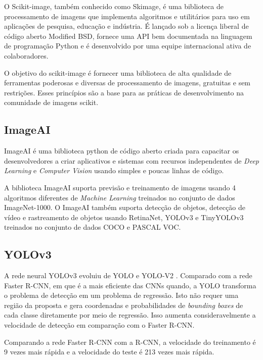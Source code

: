 O Scikit-image, também conhecido como Skimage, é uma biblioteca de processamento de imagens que implementa algoritmos e utilitários para uso em aplicações de pesquisa, educação e indústria. É lançado sob a licença liberal de código aberto Modified BSD, fornece uma API bem documentada na linguagem de programação Python e é desenvolvido por uma equipe internacional ativa de colaboradores.

O objetivo do scikit-image é fornecer uma biblioteca de alta qualidade de ferramentas poderosas e diversas de processamento de imagens, gratuitas e sem restrições. Esses princípios são a base para as práticas de desenvolvimento na comunidade de imagens scikit.\cite{skimage}

\subsection{ImageAI}

ImageAI é uma biblioteca python de código aberto criada para capacitar os desenvolvedores a criar aplicativos e sistemas com recursos independentes de \textit{Deep Learning} e \textit{Computer Vision} usando simples e poucas linhas de código.

A biblioteca ImageAI suporta previsão e treinamento de imagens usando 4 algoritmos diferentes de \textit{Machine Learning} treinados no conjunto de dados ImageNet-1000. O ImageAI também suporta detecção de objetos, detecção de vídeo e rastreamento de objetos usando RetinaNet, YOLOv3 e TinyYOLOv3 treinados no conjunto de dados COCO e PASCAL VOC.\cite{ImageAI}

\subsection{YOLOv3}

A rede neural YOLOv3 evoluiu de YOLO e YOLO-V2 \cite{redmon2018yolov3}. Comparado com a rede Faster R-CNN, em que é a mais eficiente das CNNs quando, a YOLO transforma o problema de detecção em um problema de regressão. Isto não requer uma região da proposta e gera coordenadas e probabilidades de \textit{bounding boxes} de cada classe diretamente por meio de regressão. Isso aumenta consideravelmente a velocidade de detecção em comparação com o Faster R-CNN.\cite{yolov3_apple}

Comparando a rede Faster R-CNN com a  R-CNN, a velocidade do treinamento  é 9 vezes mais rápida e a velocidade do teste é 213 vezes mais rápida. \cite{7960069}

